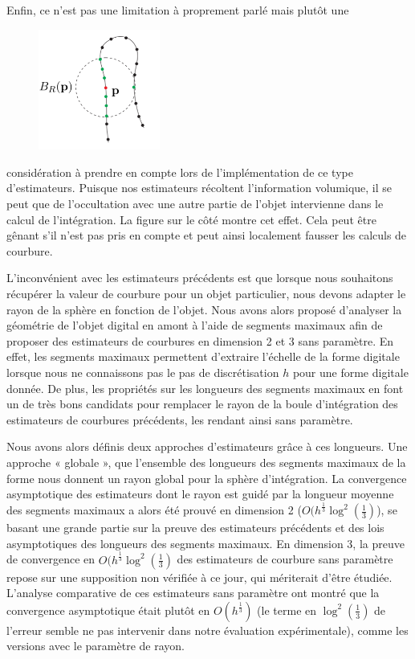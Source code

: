 Enfin, ce n'est pas une limitation à proprement parlé mais plutôt une
%
\begin{figure}
	\includegraphics[width=4cm]{images/CriticalRadius}
\end{figure}
%
considération à prendre en compte lors de l'implémentation de ce type
d'estimateurs. Puisque nos estimateurs récoltent l'information volumique, il se
peut que de l'occultation avec une autre partie de l'objet intervienne dans le
calcul de l’intégration. La figure sur le côté montre cet effet. Cela peut être
gênant s'il n'est pas pris en compte et peut ainsi localement fausser les calculs de
courbure.


L'inconvénient avec les estimateurs précédents est que lorsque nous souhaitons
récupérer la valeur de courbure pour un objet particulier, nous devons adapter
le rayon de la sphère en fonction de l'objet. Nous avons alors proposé
d'analyser la géométrie de l'objet digital en amont à l'aide de segments
maximaux afin de proposer des estimateurs de courbures en dimension 2 et 3 sans
paramètre. En effet, les segments maximaux permettent d'extraire l'échelle de la
forme digitale lorsque nous ne connaissons pas le pas de discrétisation $h$ pour
une forme digitale donnée. De plus, les propriétés sur les longueurs des
segments maximaux en font un de très bons candidats pour remplacer le rayon de
la boule d'intégration des estimateurs de courbures précédents, les rendant
ainsi sans paramètre.


Nous avons alors définis deux approches d'estimateurs grâce à ces longueurs. Une
approche « globale », \cad que l'ensemble des longueurs des segments maximaux de
la forme nous donnent un rayon global pour la sphère d'intégration. La
convergence asymptotique des estimateurs dont le rayon est guidé par la longueur
moyenne des segments maximaux a alors été prouvé en dimension 2
($O(h^\frac{1}{3} \log^2 \left(\frac{1}{3}\right)$), se basant une grande partie
sur la preuve des estimateurs précédents et des lois asymptotiques des longueurs
des segments maximaux. En dimension 3, la preuve de convergence en
$O(h^\frac{1}{3} \log^2 \left(\frac{1}{3}\right)$ des estimateurs de courbure
sans paramètre repose sur une supposition non vérifiée à ce jour, qui mériterait
d'être étudiée. L'analyse comparative de ces estimateurs sans paramètre ont
montré que la convergence asymptotique était plutôt en $O(h^\frac{1}{3})$ (le
terme en $\log^2 \left(\frac{1}{3}\right)$ de l'erreur semble ne pas intervenir
dans notre évaluation expérimentale), comme les versions avec le paramètre de
rayon.


